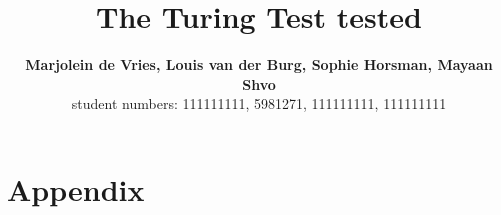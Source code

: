 \documentclass[10pt,letterpaper]{article}
\title{The Turing Test tested}
\author{{\large \bf Marjolein de Vries, Louis van der Burg, Sophie Horsman, Mayaan Shvo} \\
   student numbers: 111111111, 5981271, 111111111, 111111111 \\
}
\begin{document}
\maketitle









\section{Appendix}





\setlength{\bibleftmargin}{.125in}
\setlength{\bibindent}{-\bibleftmargin}


\end{document}
